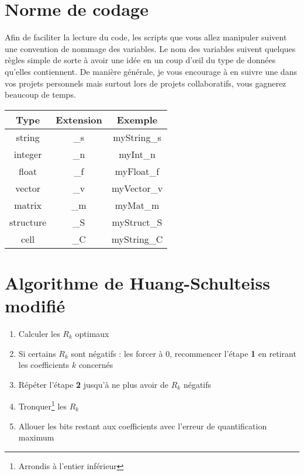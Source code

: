 \documentclass{article}
\begin{document}

\appendix
\section{Norme de codage}
Afin de faciliter la lecture du code, les scripts que vous allez manipuler suivent une convention de nommage des variables. Le nom des variables suivent quelques règles simple de sorte à avoir une idée en un coup d'\oe il du type de données qu'elles contiennent. De manière générale, je vous encourage à en suivre une dans vos projets personnels mais surtout lors de projets collaboratifs, vous gagnerez beaucoup de temps.

\begin{tabular}{c|c|c}
\hline
Type & Extension & Exemple \\
\hline
string & \_s & myString\_s \\
integer & \_n & myInt\_n \\
float & \_f & myFloat\_f \\
vector & \_v & myVector\_v \\
matrix & \_m & myMat\_m \\
structure & \_S & myStruct\_S \\
cell & \_C & myString\_C \\
\hline
\end{tabular}

\section{Algorithme de Huang-Schulteiss modifié}
\label{hsm_algo}
\begin{enumerate}[label=\textbf{\arabic*})]
	\item Calculer les $R_k$ optimaux
	\item Si certains $R_k$ sont négatifs : les forcer à 0, recommencer l'étape \textbf{1} en retirant les coefficients $k$ concernés
	\item Répéter l'étape \textbf{2} jusqu'à ne plus avoir de $R_k$ négatifs
	\item Tronquer\footnote{Arrondis à l'entier inférieur} les $R_k$
	\item Allouer les bits restant aux coefficients avec l'erreur de quantification maximum
\end{enumerate}
\end{document}
